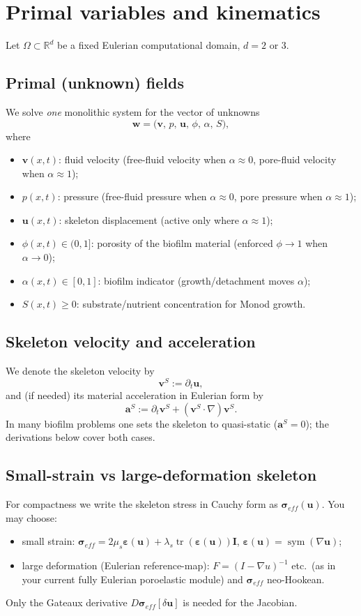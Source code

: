 \documentclass[11pt]{article}
\newcommand{\R}{\mathbb{R}}
\newcommand{\I}{\bm{I}}
\newcommand{\grad}{\nabla}
\newcommand{\eps}{\bm{\varepsilon}}
\newcommand{\sym}{\operatorname{sym}}
\newcommand{\tr}{\operatorname{tr}}
\newcommand{\Dt}{\partial_t}
\begin{document}
\section{Primal variables and kinematics}

Let $\Omega\subset\R^d$ be a fixed Eulerian computational domain, $d=2$ or $3$.

\subsection*{Primal (unknown) fields}

We solve \emph{one} monolithic system for the vector of unknowns
\[
\boxed{
\bm{w} = \big(\bm{v},\,p,\,\bm{u},\,\phi,\,\alpha,\,S\big),
}
\]
where
\begin{itemize}
\item $\bm{v}(x,t)$: fluid velocity (free-fluid velocity when $\alpha\approx 0$, pore-fluid velocity when $\alpha\approx 1$);
\item $p(x,t)$: pressure (free-fluid pressure when $\alpha\approx 0$, pore pressure when $\alpha\approx 1$);
\item $\bm{u}(x,t)$: skeleton displacement (active only where $\alpha\approx 1$);
\item $\phi(x,t)\in(0,1]$: porosity of the biofilm material (enforced $\phi\to 1$ when $\alpha\to 0$);
\item $\alpha(x,t)\in[0,1]$: biofilm indicator (growth/detachment moves $\alpha$);
\item $S(x,t)\ge 0$: substrate/nutrient concentration for Monod growth.
\end{itemize}

\subsection*{Skeleton velocity and acceleration}
We denote the skeleton velocity by
\[
\bm{v}^S := \Dt \bm{u},
\]
and (if needed) its material acceleration in Eulerian form by
\[
\bm{a}^S := \Dt \bm{v}^S + (\bm{v}^S\cdot\grad)\bm{v}^S.
\]
In many biofilm problems one sets the skeleton to quasi-static ($\bm{a}^S=0$); the derivations below cover both cases.

\subsection*{Small-strain vs large-deformation skeleton}
For compactness we write the skeleton stress in Cauchy form as $\bm{\sigma}_{eff}(\bm{u})$.
You may choose:
\begin{itemize}
\item small strain: $\bm{\sigma}_{eff}=2\mu_s \eps(\bm{u})+\lambda_s \tr(\eps(\bm{u}))\I$, $\eps(\bm{u})=\sym(\grad \bm{u})$;
\item large deformation (Eulerian reference-map): $F=(I-\grad u)^{-1}$ etc.\ (as in your current fully Eulerian poroelastic module) and $\bm{\sigma}_{eff}$ neo-Hookean.
\end{itemize}
Only the Gateaux derivative $D\bm{\sigma}_{eff}[\delta\bm{u}]$ is needed for the Jacobian.
\end{document}

